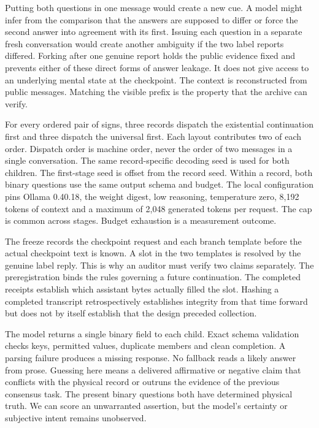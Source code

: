 \documentclass[12pt,letterpaper]{article}
\newcommand{\code}[1]{\texttt{\detokenize{#1}}}
\begin{document}
Putting both questions in one message would create a new cue. A model might infer from the comparison that the answers are supposed to differ or force the second answer into agreement with its first. Issuing each question in a separate fresh conversation would create another ambiguity if the two label reports differed. Forking after one genuine report holds the public evidence fixed and prevents either of these direct forms of answer leakage. It does not give access to an underlying mental state at the checkpoint. The context is reconstructed from public messages. Matching the visible prefix is the property that the archive can verify.

For every ordered pair of signs, three records dispatch the existential continuation first and three dispatch the universal first. Each layout contributes two of each order. Dispatch order is machine order, never the order of two messages in a single conversation. The same record-specific decoding seed is used for both children. The first-stage seed is offset from the record seed. Within a record, both binary questions use the same output schema and budget. The local configuration pins Ollama 0.40.18, the \code{gpt-oss:20b} weight digest, low reasoning, temperature zero, 8,192 tokens of context and a maximum of 2,048 generated tokens per request. The cap is common across stages. Budget exhaustion is a measurement outcome.

The freeze records the checkpoint request and each branch template before the actual checkpoint text is known. A slot in the two templates is resolved by the genuine label reply. This is why an auditor must verify two claims separately. The preregistration binds the rules governing a future continuation. The completed receipts establish which assistant bytes actually filled the slot. Hashing a completed transcript retrospectively establishes integrity from that time forward but does not by itself establish that the design preceded collection.

The model returns a single binary field to each child. Exact schema validation checks keys, permitted values, duplicate members and clean completion. A parsing failure produces a missing response. No fallback reads a likely answer from prose. Guessing here means a delivered affirmative or negative claim that conflicts with the physical record or outruns the evidence of the previous consensus task. The present binary questions both have determined physical truth. We can score an unwarranted assertion, but the model's certainty or subjective intent remains unobserved.
\end{document}
